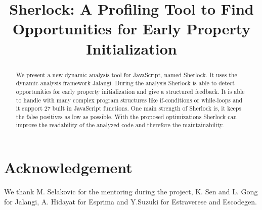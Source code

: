 \documentclass[authoryear,preprint]{sigplanconf}
\begin{document}
\setlength{\pdfpageheight}{\paperheight}
\setlength{\pdfpagewidth}{\paperwidth}


\title{Sherlock: A Profiling Tool to Find Opportunities for Early Property Initialization}


\maketitle

\begin{abstract}
We present a new dynamic analysis tool for JavaScript, named Sherlock. It uses the  dynamic analysis framework Jalangi. 
During the analysis Sherlock is able to detect opportunities for early property initialization and give a structured feedback. 
It is able to handle with many complex program structures like if-conditions or while-loops and it support 27 built in JavaScript 
functions. One main strength of Sherlock is, it keeps the false positives as low as possible. With the proposed optimizations 
Sherlock can improve the readability of the analyzed code and therefore the maintainability.
\end{abstract}








\section*{Acknowledgement}
We thank M. Selakovic for the mentoring during the project, K. Sen and L. Gong for Jalangi, A. Hidayat for Esprima and Y.Suzuki for Estraverese and Escodegen.




\end{document}
